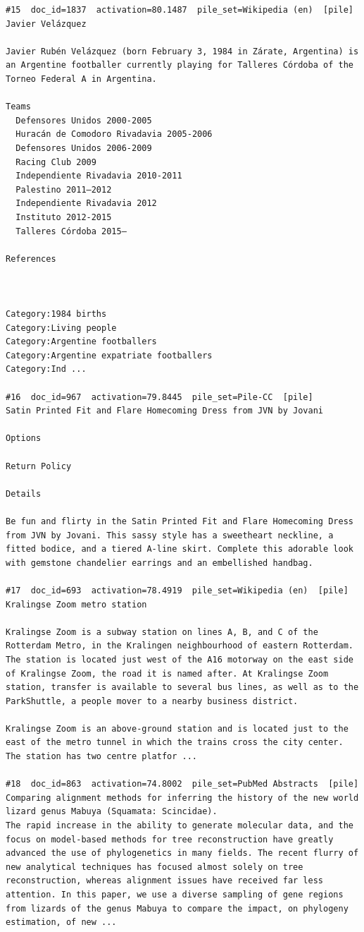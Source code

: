\begin{verbatim}
#15  doc_id=1837  activation=80.1487  pile_set=Wikipedia (en)  [pile]
Javier Velázquez

Javier Rubén Velázquez (born February 3, 1984 in Zárate, Argentina) is an Argentine footballer currently playing for Talleres Córdoba of the Torneo Federal A in Argentina.

Teams
  Defensores Unidos 2000-2005
  Huracán de Comodoro Rivadavia 2005-2006
  Defensores Unidos 2006-2009
  Racing Club 2009
  Independiente Rivadavia 2010-2011
  Palestino 2011–2012
  Independiente Rivadavia 2012
  Instituto 2012-2015
  Talleres Córdoba 2015–

References
 
 

Category:1984 births
Category:Living people
Category:Argentine footballers
Category:Argentine expatriate footballers
Category:Ind ...

#16  doc_id=967  activation=79.8445  pile_set=Pile-CC  [pile]
Satin Printed Fit and Flare Homecoming Dress from JVN by Jovani

Options

Return Policy

Details

Be fun and flirty in the Satin Printed Fit and Flare Homecoming Dress from JVN by Jovani. This sassy style has a sweetheart neckline, a fitted bodice, and a tiered A-line skirt. Complete this adorable look with gemstone chandelier earrings and an embellished handbag.

#17  doc_id=693  activation=78.4919  pile_set=Wikipedia (en)  [pile]
Kralingse Zoom metro station

Kralingse Zoom is a subway station on lines A, B, and C of the Rotterdam Metro, in the Kralingen neighbourhood of eastern Rotterdam. The station is located just west of the A16 motorway on the east side of Kralingse Zoom, the road it is named after. At Kralingse Zoom station, transfer is available to several bus lines, as well as to the ParkShuttle, a people mover to a nearby business district.

Kralingse Zoom is an above-ground station and is located just to the east of the metro tunnel in which the trains cross the city center. The station has two centre platfor ...

#18  doc_id=863  activation=74.8002  pile_set=PubMed Abstracts  [pile]
Comparing alignment methods for inferring the history of the new world lizard genus Mabuya (Squamata: Scincidae).
The rapid increase in the ability to generate molecular data, and the focus on model-based methods for tree reconstruction have greatly advanced the use of phylogenetics in many fields. The recent flurry of new analytical techniques has focused almost solely on tree reconstruction, whereas alignment issues have received far less attention. In this paper, we use a diverse sampling of gene regions from lizards of the genus Mabuya to compare the impact, on phylogeny estimation, of new ...


\end{verbatim}
